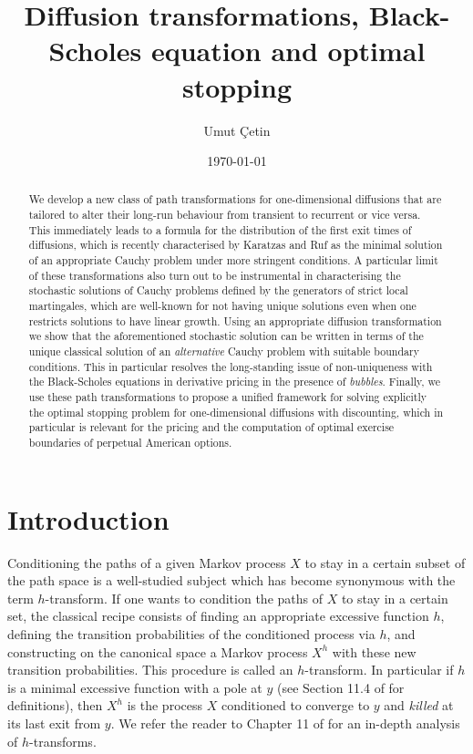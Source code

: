 \documentclass[11pt,reqno]{amsart}
\numberwithin{equation}{section}
\begin{document}
\title{Diffusion transformations, Black-Scholes equation and optimal stopping}
\author{Umut \c{C}etin}
\address{Department of Statistics, London School of Economics and Political Science, 10 Houghton st, London, WC2A 2AE, UK}
\date{\today}
\begin{abstract}
We develop a new class of path transformations for one-dimensional diffusions that are tailored to alter their long-run behaviour from transient to recurrent or vice versa. This immediately leads to a formula for the  distribution of the first exit times of diffusions, which is recently characterised by Karatzas and Ruf \cite{KR} as the minimal solution of an  appropriate Cauchy problem under more stringent conditions. A particular limit of these transformations also turn out to be instrumental in characterising the stochastic solutions of Cauchy problems defined by the generators of strict local martingales, which are well-known for not having unique solutions even when  one restricts solutions  to have  linear growth. Using an appropriate diffusion transformation we show that the aforementioned stochastic solution can be written in terms of the unique classical  solution of an {\em alternative} Cauchy problem with suitable boundary conditions. This in particular  resolves the long-standing issue of non-uniqueness with the Black-Scholes equations in derivative pricing in the presence of {\em bubbles}.  Finally, we use these path transformations to propose a unified framework for solving explicitly the optimal stopping problem for one-dimensional diffusions with discounting, which in particular is relevant for the pricing and the computation of optimal exercise boundaries of perpetual American options.
\end{abstract}
\maketitle



\section{Introduction} 
 Conditioning the paths of a given Markov process $X$ to stay in a certain subset of the path space is a well-studied subject which has become synonymous with the term $h$-transform.  If one wants to condition the paths of $X$ to stay in a certain set, the classical recipe consists of finding an appropriate excessive function $h$,  defining the transition probabilities of the conditioned process via  $h$, and constructing on the canonical space a Markov process $X^h$ with these new transition probabilities. This procedure is called an $h$-transform. In particular if $h$ is a minimal excessive function with a pole at $y$ (see Section 11.4 of \cite{ChungWalsh} for definitions), then $X^h$ is the process $X$ conditioned to converge to $y$ and {\em killed} at its last exit from $y$. We  refer the reader to Chapter 11 of \cite{ChungWalsh} for an in-depth analysis of $h$-transforms.
 
\end{document}
